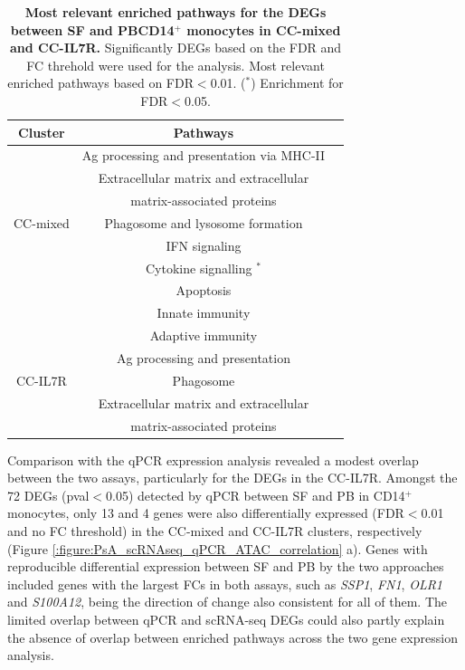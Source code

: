 \begin{table}[htbp]
\centering
\begin{tabular}{@{} c c c}
\toprule
\textbf{Cluster} & \textbf{Pathways} \\
\midrule
\midrule
         & Ag processing and presentation via MHC-II \\
				 & Extracellular matrix and extracellular \\
				 & matrix-associated proteins \\
CC-mixed & Phagosome and lysosome formation \\
				 & IFN signaling & \\
				 & Cytokine signalling $^\ast$ \\
				 & Apoptosis \\
				 & Innate immunity \\
\midrule				
         & Adaptive immunity \\
         & Ag processing and presentation \\
CC-IL7R	 & Phagosome \\
         & Extracellular matrix and extracellular \\
				 & matrix-associated proteins \\
\bottomrule
\end{tabular}
\medskip %
\caption[Most relevant enriched pathways for the DEGs between SF and PBCD14$^+$ monocytes in CC-mixed and CC-IL7R.]{\textbf{Most relevant enriched pathways for the DEGs between SF and PBCD14$^+$ monocytes in CC-mixed and CC-IL7R.} Significantly DEGs based on the FDR and FC threhold were used for the analysis. Most relevant enriched pathways based on FDR$<$0.01. ($^\ast$) Enrichment for FDR$<$0.05.}
\label{tab:PSA_scRNAseq_CD14_DEGs_pathway_analysis}
\end{table}




Comparison with the qPCR expression analysis revealed a modest overlap between the two assays, particularly for the DEGs in the CC-IL7R. Amongst the 72 DEGs (pval$<$0.05) detected by qPCR between SF and PB in CD14$^+$ monocytes, only 13 and 4 genes were also differentially expressed (FDR$<$0.01 and no FC threshold) in the CC-mixed and CC-IL7R clusters, respectively (Figure \ref{:figure:PsA_scRNAseq_qPCR_ATAC_correlation} a). Genes with reproducible differential expression between SF and PB by the two approaches included genes with the largest FCs in both assays, such as \textit{SSP1}, \textit{FN1}, \textit{OLR1} and \textit{S100A12}, being the direction of change also consistent for all of them. %
The limited overlap between qPCR and scRNA-seq DEGs could also partly explain the absence of overlap between enriched pathways across the two gene expression analysis. 
   
